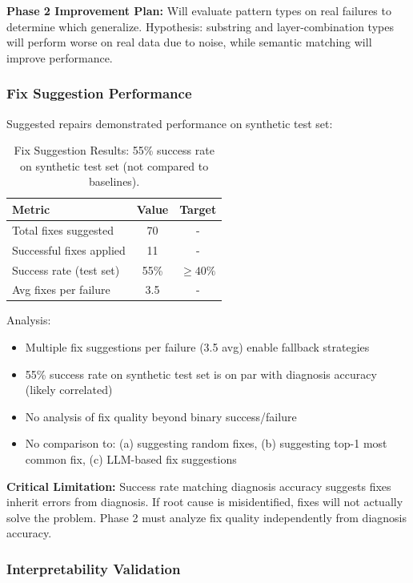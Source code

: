 \documentclass[11pt]{article}
\begin{document}
\textbf{Phase 2 Improvement Plan:} Will evaluate pattern types on real failures to determine which generalize. Hypothesis: substring and layer-combination types will perform worse on real data due to noise, while semantic matching will improve performance.

\subsubsection{Fix Suggestion Performance}

Suggested repairs demonstrated performance on synthetic test set:

\begin{table}[h!]
\centering
\begin{tabular}{lcc}
\toprule
\textbf{Metric} & \textbf{Value} & \textbf{Target} \\
\midrule
Total fixes suggested & 70 & - \\
Successful fixes applied & 11 & - \\
Success rate (test set) & 55\% & $\geq 40\%$ \\
Avg fixes per failure & 3.5 & - \\
\bottomrule
\end{tabular}
\caption{Fix Suggestion Results: 55\% success rate on synthetic test set (not compared to baselines).}
\label{tab:fix_results}
\end{table}

Analysis:
\begin{itemize}
    \item Multiple fix suggestions per failure (3.5 avg) enable fallback strategies
    \item 55\% success rate on synthetic test set is on par with diagnosis accuracy (likely correlated)
    \item No analysis of fix quality beyond binary success/failure
    \item No comparison to: (a) suggesting random fixes, (b) suggesting top-1 most common fix, (c) LLM-based fix suggestions
\end{itemize}

\textbf{Critical Limitation:} Success rate matching diagnosis accuracy suggests fixes inherit errors from diagnosis. If root cause is misidentified, fixes will not actually solve the problem. Phase 2 must analyze fix quality independently from diagnosis accuracy.

\subsubsection{Interpretability Validation}
\end{document}
